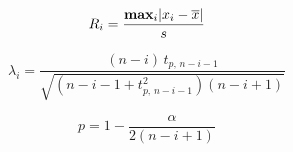 \documentclass[12pt]{article}
\begin{document}
\pagestyle{empty}
\large
{}
\pagecolor{ehandbook}

\Large
\boldmath

\[
R_i = \frac{\mbox{\bf max}_i |x_i - \overline{x}|}{s}
\]

\[
\lambda_{i} = \frac{(n-i) \, t_{p, \, n-i-1}}{\sqrt{(n-i-1+t_{p, \, n-i-1}^{2}) (n-i+1)}}
\]

\[ 
p = 1-\frac{\alpha}{2(n-i+1)}
\]
\end{document}
